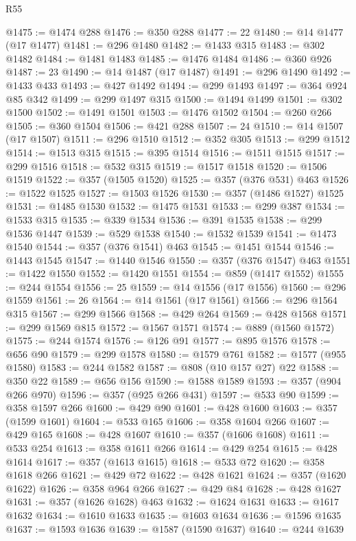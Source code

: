\begin{lexlean}{R55}
\begin{coremodule}
@1475 := @1474 @288
@1476 := @350 @288
@1477 := 22
@1480 := @14 @1477 (@17 @1477)
@1481 := @296 @1480
@1482 := @1433 @315
@1483 := @302 @1482
@1484 := @1481 @1483
@1485 := @1476 @1484
@1486 := @360 @926
@1487 := 23
@1490 := @14 @1487 (@17 @1487)
@1491 := @296 @1490
@1492 := @1433 @433
@1493 := @427 @1492
@1494 := @299 @1493
@1497 := @364 @924 @85 @342
@1499 := @299 @1497 @315
@1500 := @1494 @1499
@1501 := @302 @1500
@1502 := @1491 @1501
@1503 := @1476 @1502
@1504 := @260 @266
@1505 := @360 @1504
@1506 := @421 @288
@1507 := 24
@1510 := @14 @1507 (@17 @1507)
@1511 := @296 @1510
@1512 := @352 @305
@1513 := @299 @1512
@1514 := @1513 @315
@1515 := @395 @1514
@1516 := @1511 @1515
@1517 := @299 @1516
@1518 := @532 @315
@1519 := @1517 @1518
@1520 := @1506 @1519
@1522 := @357 (@1505 @1520)
@1525 := @357 (@376 @531) @463
@1526 := @1522 @1525
@1527 := @1503 @1526
@1530 := @357 (@1486 @1527) @1525
@1531 := @1485 @1530
@1532 := @1475 @1531
@1533 := @299 @387
@1534 := @1533 @315
@1535 := @339 @1534
@1536 := @391 @1535
@1538 := @299 @1536 @1447
@1539 := @529 @1538
@1540 := @1532 @1539
@1541 := @1473 @1540
@1544 := @357 (@376 @1541) @463
@1545 := @1451 @1544
@1546 := @1443 @1545
@1547 := @1440 @1546
@1550 := @357 (@376 @1547) @463
@1551 := @1422 @1550
@1552 := @1420 @1551
@1554 := @859 (@1417 @1552)
@1555 := @244 @1554
@1556 := 25
@1559 := @14 @1556 (@17 @1556)
@1560 := @296 @1559
@1561 := 26
@1564 := @14 @1561 (@17 @1561)
@1566 := @296 @1564 @315
@1567 := @299 @1566
@1568 := @429 @264
@1569 := @428 @1568
@1571 := @299 @1569 @815
@1572 := @1567 @1571
@1574 := @889 (@1560 @1572)
@1575 := @244 @1574
@1576 := @126 @91
@1577 := @895 @1576
@1578 := @656 @90
@1579 := @299 @1578
@1580 := @1579 @761
@1582 := @1577 (@955 @1580)
@1583 := @244 @1582
@1587 := @808 (@10 @157 @27) @22
@1588 := @350 @22
@1589 := @656 @156
@1590 := @1588 @1589
@1593 := @357 (@904 @266 @970)
@1596 := @357 (@925 @266 @431)
@1597 := @533 @90
@1599 := @358 @1597 @266
@1600 := @429 @90
@1601 := @428 @1600
@1603 := @357 (@1599 @1601)
@1604 := @533 @165
@1606 := @358 @1604 @266
@1607 := @429 @165
@1608 := @428 @1607
@1610 := @357 (@1606 @1608)
@1611 := @533 @254
@1613 := @358 @1611 @266
@1614 := @429 @254
@1615 := @428 @1614
@1617 := @357 (@1613 @1615)
@1618 := @533 @72
@1620 := @358 @1618 @266
@1621 := @429 @72
@1622 := @428 @1621
@1624 := @357 (@1620 @1622)
@1626 := @358 @964 @266
@1627 := @429 @84
@1628 := @428 @1627
@1631 := @357 (@1626 @1628) @463
@1632 := @1624 @1631
@1633 := @1617 @1632
@1634 := @1610 @1633
@1635 := @1603 @1634
@1636 := @1596 @1635
@1637 := @1593 @1636
@1639 := @1587 (@1590 @1637)
@1640 := @244 @1639

\end{coremodule}
\end{lexlean}
